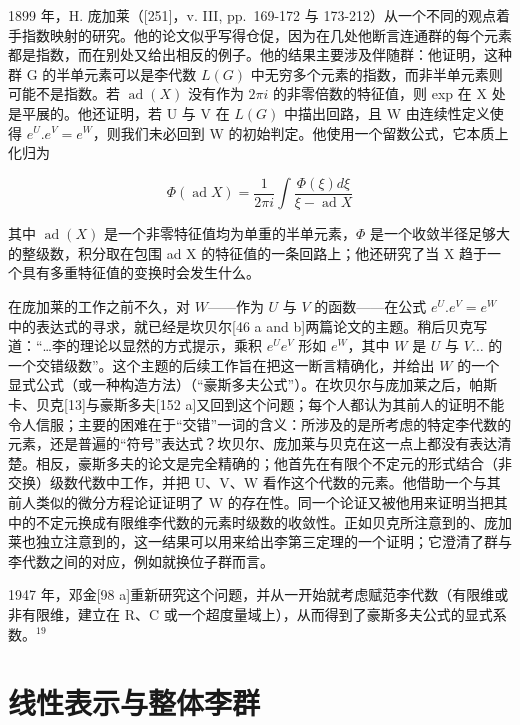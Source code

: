 1899 年，H. 庞加莱（{[}251{]}，v. III, pp.~169-172 与 173-212）从一个不同的观点着手指数映射的研究。他的论文似乎写得仓促，因为在几处他断言连通群的每个元素都是指数，而在别处又给出相反的例子。他的结果主要涉及伴随群：他证明，这种群 G 的半单元素可以是李代数 \(L(G)\) 中无穷多个元素的指数，而非半单元素则可能不是指数。若 \(\operatorname{ad}(X)\) 没有作为 \(2\pi i\) 的非零倍数的特征值，则 exp 在 X 处是平展的。他还证明，若 U 与 V 在 \(L(G)\) 中描出回路，且 W 由连续性定义使得 \(e^{U}.e^{V}=e^{W}\)，则我们未必回到 W 的初始判定。他使用一个留数公式，它本质上化归为

\[
\Phi (\operatorname{ad} X) = \frac {1}{2 \pi i} \int \frac {\Phi (\xi) d \xi}{\xi - \operatorname{ad} X}
\]

其中 \(\operatorname{ad}(X)\) 是一个非零特征值均为单重的半单元素，\(\Phi\) 是一个收敛半径足够大的整级数，积分取在包围 ad X 的特征值的一条回路上；他还研究了当 X 趋于一个具有多重特征值的变换时会发生什么。

在庞加莱的工作之前不久，对 \(W\)——作为 \(U\) 与 \(V\) 的函数——在公式 \(e^U.e^V = e^W\) 中的表达式的寻求，就已经是坎贝尔{[}46 a and b{]}两篇论文的主题。稍后贝克写道：“\ldots 李的理论以显然的方式提示，乘积 \(e^Ue^V\) 形如 \(e^W\)，其中 \(W\) 是 \(U\) 与 \(V\ldots\) 的一个交错级数”。这个主题的后续工作旨在把这一断言精确化，并给出 \(W\) 的一个显式公式（或一种构造方法）（“豪斯多夫公式”）。在坎贝尔与庞加莱之后，帕斯卡、贝克{[}13{]}与豪斯多夫{[}152 a{]}又回到这个问题；每个人都认为其前人的证明不能令人信服；主要的困难在于“交错”一词的含义：所涉及的是所考虑的特定李代数的元素，还是普遍的“符号”表达式？坎贝尔、庞加莱与贝克在这一点上都没有表达清楚。相反，豪斯多夫的论文是完全精确的；他首先在有限个不定元的形式结合（非交换）级数代数中工作，并把 U、V、W 看作这个代数的元素。他借助一个与其前人类似的微分方程论证证明了 W 的存在性。同一个论证又被他用来证明当把其中的不定元换成有限维李代数的元素时级数的收敛性。正如贝克所注意到的、庞加莱也独立注意到的，这一结果可以用来给出李第三定理的一个证明；它澄清了群与李代数之间的对应，例如就换位子群而言。

1947 年，邓金{[}98 a{]}重新研究这个问题，并从一开始就考虑赋范李代数（有限维或非有限维，建立在 R、C 或一个超度量域上），从而得到了豪斯多夫公式的显式系数。\(^{19}\)

\section{线性表示与整体李群}


